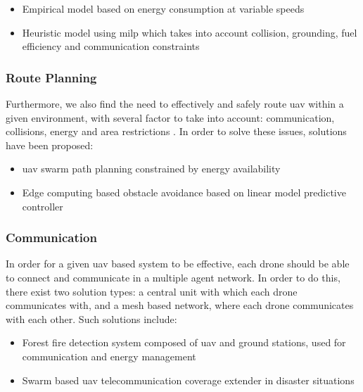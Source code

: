 \documentclass[runningheads]{llncs}
\begin{document}
\begin{itemize}
	\item Empirical model based on energy consumption at variable speeds \cite{inproceedings1}
	\item Heuristic model using \acrfull{milp} which takes into account collision, grounding, fuel efficiency and communication constraints \cite{Grotli2012} 
\end{itemize}

\subsubsection{Route Planning}

Furthermore, we also find the need to effectively and safely route \acrshort{uav} within a given environment, with several factor to take into account: communication, collisions, energy and area restrictions \cite{inproceedings}. In order to solve these issues, solutions have been proposed:

\begin{itemize}
	\item \acrshort{uav} swarm path planning constrained by energy availability \cite{inproceedings}
	\item Edge computing based obstacle avoidance based on linear model predictive controller \cite{inproceedings2}
\end{itemize}

\subsubsection{Communication}

In order for a given \acrshort{uav} based system to be effective, each drone should be able to connect and communicate in a multiple agent network. In order to do this, there exist two solution types: a central unit with which each drone communicates with, and a mesh based network, where each drone communicates with each other. Such solutions include:

\begin{itemize}
	\item Forest fire detection system composed of \acrshort{uav} and ground stations, used for communication and energy management \cite{inproceedings3}
	\item Swarm based \acrshort{uav} telecommunication coverage extender in disaster situations \cite{6318390}
\end{itemize}
\end{document}

